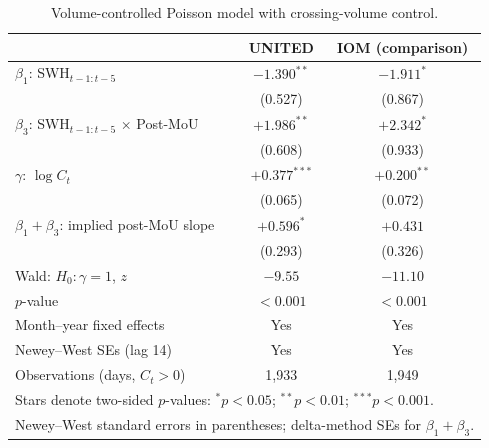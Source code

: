 \begin{table}[!htbp]
\centering
\small
\caption{Volume-controlled Poisson model with crossing-volume control.}
\label{tab:rate}
\begin{tabular}{lcc}
\hline
                              & UNITED & IOM (comparison) \\
\hline
$\beta_1$: SWH$_{t-1:t-5}$            & $-1.390^{**}$ & $-1.911^{*}$ \\
                                      & (0.527) & (0.867) \\
$\beta_3$: SWH$_{t-1:t-5}$ $\times$ Post-MoU & $+1.986^{**}$ & $+2.342^{*}$ \\
                                      & (0.608) & (0.933) \\
$\gamma$: $\log C_t$                  & $+0.377^{***}$ & $+0.200^{**}$ \\
                                      & (0.065) & (0.072) \\
$\beta_1+\beta_3$: implied post-MoU slope    & $+0.596^{*}$ & $+0.431$ \\
                                      & (0.293) & (0.326) \\
\hline
Wald: $H_{0}: \gamma = 1$, $z$        & $-9.55$ & $-11.10$ \\
$p$-value                             & $< 0.001$ & $< 0.001$ \\
Month--year fixed effects             & Yes            & Yes            \\
Newey--West SEs (lag 14)              & Yes            & Yes            \\
Observations (days, $C_t>0$)          & 1,933 & 1,949 \\
\hline
\multicolumn{3}{l}{\footnotesize Stars denote two-sided $p$-values: $^{*}p<0.05$; $^{**}p<0.01$; $^{***}p<0.001$.} \\
\multicolumn{3}{l}{\footnotesize Newey--West standard errors in parentheses; delta-method SEs for $\beta_1+\beta_3$.} \\
\end{tabular}
\end{table}

